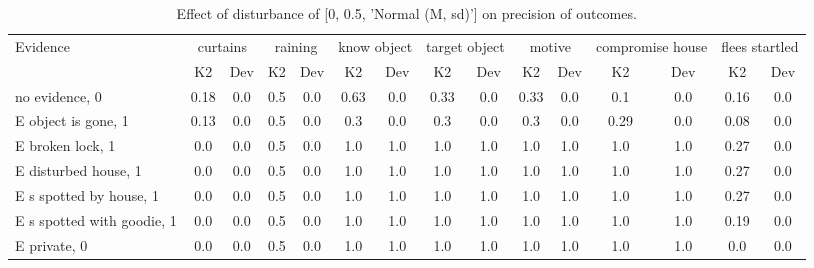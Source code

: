 \begin{table}\begin{tabular}{l|cc|cc|cc|cc|cc|cc|cc}\toprule\multirow{2}{*}{Evidence} & \multicolumn{2}{c}{curtains}& \multicolumn{2}{c}{raining}& \multicolumn{2}{c}{know object}& \multicolumn{2}{c}{target object}& \multicolumn{2}{c}{motive}& \multicolumn{2}{c}{compromise house}& \multicolumn{2}{c}{flees startled}\\& {K2} & {Dev}& {K2} & {Dev}& {K2} & {Dev}& {K2} & {Dev}& {K2} & {Dev}& {K2} & {Dev}& {K2} & {Dev}\\\midrule
no evidence, 0 & \cellcolor{Bittersweet}0.18&\cellcolor{Bittersweet}0.0&0.5&0.0&\cellcolor{Bittersweet}0.63&\cellcolor{Bittersweet}0.0&0.33&0.0&0.33&0.0&\cellcolor{Bittersweet}0.1&\cellcolor{Bittersweet}0.0&\cellcolor{Bittersweet}0.16&\cellcolor{Bittersweet}0.0\\E object is gone, 1 & \cellcolor{Bittersweet}0.13&\cellcolor{Bittersweet}0.0&0.5&0.0&\cellcolor{Bittersweet}0.3&\cellcolor{Bittersweet}0.0&0.3&0.0&\cellcolor{Bittersweet}0.3&\cellcolor{Bittersweet}0.0&0.29&0.0&\cellcolor{Bittersweet}0.08&\cellcolor{Bittersweet}0.0\\E broken lock, 1 & \cellcolor{Bittersweet}0.0&\cellcolor{Bittersweet}0.0&0.5&0.0&\cellcolor{Bittersweet}1.0&\cellcolor{Bittersweet}1.0&\cellcolor{Bittersweet}1.0&\cellcolor{Bittersweet}1.0&\cellcolor{Bittersweet}1.0&\cellcolor{Bittersweet}1.0&\cellcolor{Bittersweet}1.0&\cellcolor{Bittersweet}1.0&\cellcolor{Bittersweet}0.27&\cellcolor{Bittersweet}0.0\\E disturbed house, 1 & \cellcolor{Bittersweet}0.0&\cellcolor{Bittersweet}0.0&0.5&0.0&\cellcolor{Bittersweet}1.0&\cellcolor{Bittersweet}1.0&\cellcolor{Bittersweet}1.0&\cellcolor{Bittersweet}1.0&\cellcolor{Bittersweet}1.0&\cellcolor{Bittersweet}1.0&\cellcolor{Bittersweet}1.0&\cellcolor{Bittersweet}1.0&\cellcolor{Bittersweet}0.27&\cellcolor{Bittersweet}0.0\\E s spotted by house, 1 & \cellcolor{Bittersweet}0.0&\cellcolor{Bittersweet}0.0&0.5&0.0&\cellcolor{Bittersweet}1.0&\cellcolor{Bittersweet}1.0&\cellcolor{Bittersweet}1.0&\cellcolor{Bittersweet}1.0&\cellcolor{Bittersweet}1.0&\cellcolor{Bittersweet}1.0&\cellcolor{Bittersweet}1.0&\cellcolor{Bittersweet}1.0&\cellcolor{Bittersweet}0.27&\cellcolor{Bittersweet}0.0\\E s spotted with goodie, 1 & \cellcolor{Bittersweet}0.0&\cellcolor{Bittersweet}0.0&0.5&0.0&\cellcolor{Bittersweet}1.0&\cellcolor{Bittersweet}1.0&\cellcolor{Bittersweet}1.0&\cellcolor{Bittersweet}1.0&\cellcolor{Bittersweet}1.0&\cellcolor{Bittersweet}1.0&\cellcolor{Bittersweet}1.0&\cellcolor{Bittersweet}1.0&\cellcolor{Bittersweet}0.19&\cellcolor{Bittersweet}0.0\\E private, 0 & \cellcolor{Bittersweet}0.0&\cellcolor{Bittersweet}0.0&0.5&0.0&\cellcolor{Bittersweet}1.0&\cellcolor{Bittersweet}1.0&\cellcolor{Bittersweet}1.0&\cellcolor{Bittersweet}1.0&\cellcolor{Bittersweet}1.0&\cellcolor{Bittersweet}1.0&\cellcolor{Bittersweet}1.0&\cellcolor{Bittersweet}1.0&\cellcolor{Bittersweet}0.0&\cellcolor{Bittersweet}0.0\\\bottomrule\end{tabular}\caption{Effect of disturbance of [0, 0.5, 'Normal (M, sd)'] on precision of outcomes.}\end{table}